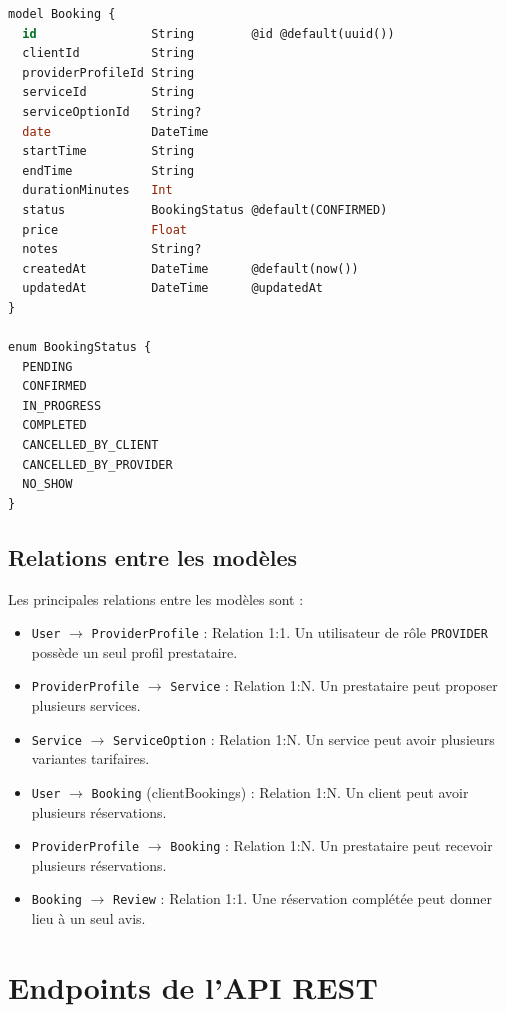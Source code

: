 \begin{lstlisting}[language=SQL, caption={Champs principaux du modèle Booking (Prisma Schema)}]
model Booking {
  id                String        @id @default(uuid())
  clientId          String
  providerProfileId String
  serviceId         String
  serviceOptionId   String?
  date              DateTime
  startTime         String
  endTime           String
  durationMinutes   Int
  status            BookingStatus @default(CONFIRMED)
  price             Float
  notes             String?
  createdAt         DateTime      @default(now())
  updatedAt         DateTime      @updatedAt
}

enum BookingStatus {
  PENDING
  CONFIRMED
  IN_PROGRESS
  COMPLETED
  CANCELLED_BY_CLIENT
  CANCELLED_BY_PROVIDER
  NO_SHOW
}
\end{lstlisting}

\subsection{Relations entre les modèles}

Les principales relations entre les modèles sont :

\begin{itemize}
    \item \texttt{User} $\rightarrow$ \texttt{ProviderProfile} : Relation 1:1. Un utilisateur de rôle \texttt{PROVIDER} possède un seul profil prestataire.
    \item \texttt{ProviderProfile} $\rightarrow$ \texttt{Service} : Relation 1:N. Un prestataire peut proposer plusieurs services.
    \item \texttt{Service} $\rightarrow$ \texttt{ServiceOption} : Relation 1:N. Un service peut avoir plusieurs variantes tarifaires.
    \item \texttt{User} $\rightarrow$ \texttt{Booking} (clientBookings) : Relation 1:N. Un client peut avoir plusieurs réservations.
    \item \texttt{ProviderProfile} $\rightarrow$ \texttt{Booking} : Relation 1:N. Un prestataire peut recevoir plusieurs réservations.
    \item \texttt{Booking} $\rightarrow$ \texttt{Review} : Relation 1:1. Une réservation complétée peut donner lieu à un seul avis.
\end{itemize}

\section{Endpoints de l'API REST}

